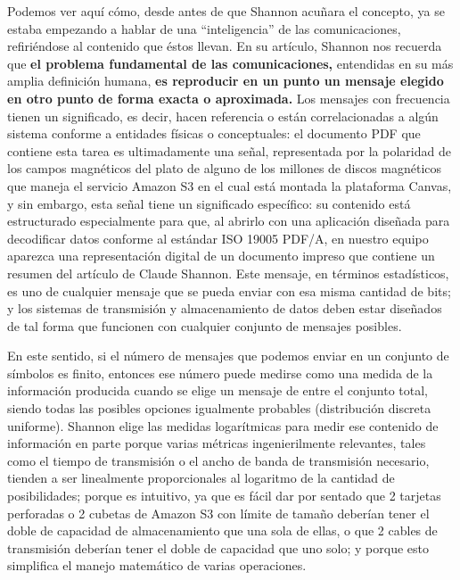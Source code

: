 \documentclass[spanish]{article}
\begin{document}
Podemos ver aquí cómo, desde antes de que Shannon acuñara el concepto, ya se estaba empezando a hablar de una ``inteligencia'' de las comunicaciones, refiriéndose al contenido que éstos llevan. En su artículo, Shannon nos recuerda que \textbf{el problema fundamental de las comunicaciones,} entendidas en su más amplia definición humana, \textbf{es reproducir en un punto un mensaje elegido en otro punto de forma exacta o aproximada.} Los mensajes con frecuencia tienen un significado, es decir, hacen referencia o están correlacionadas a algún sistema conforme a entidades físicas o conceptuales: el documento PDF que contiene esta tarea es ultimadamente una señal, representada por la polaridad de los campos magnéticos del plato de alguno de los millones de discos magnéticos que maneja el servicio \faAws{} Amazon S3 en el cual está montada la plataforma Canvas, y sin embargo, esta señal tiene un significado específico: su contenido está estructurado especialmente para que, al abrirlo con una aplicación diseñada para decodificar datos conforme al estándar ISO 19005 PDF/A, en nuestro equipo aparezca una representación digital de un documento impreso que contiene un resumen del artículo de Claude Shannon. Este mensaje, en términos estadísticos, es uno de cualquier mensaje que se pueda enviar con esa misma cantidad de bits; y los sistemas de transmisión y almacenamiento de datos deben estar diseñados de tal forma que funcionen con cualquier conjunto de mensajes posibles.

En este sentido, si el número de mensajes que podemos enviar en un conjunto de símbolos es finito, entonces ese número puede medirse como una medida de la información producida cuando se elige un mensaje de entre el conjunto total, siendo todas las posibles opciones igualmente probables (distribución discreta uniforme). Shannon elige las medidas logarítmicas para medir ese contenido de información en parte porque varias métricas ingenierilmente relevantes, tales como el tiempo de transmisión o el ancho de banda de transmisión necesario, tienden a ser linealmente proporcionales al logaritmo de la cantidad de posibilidades; porque es intuitivo, ya que es fácil dar por sentado que 2 tarjetas perforadas o 2 cubetas de Amazon S3 con límite de tamaño deberían tener el doble de capacidad de almacenamiento que una sola de ellas, o que 2 cables de transmisión deberían tener el doble de capacidad que uno solo; y porque esto simplifica el manejo matemático de varias operaciones.
\end{document}
